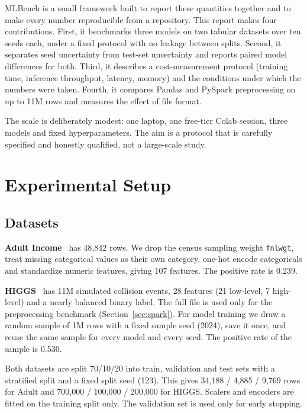 \documentclass[conference]{IEEEtran}
\begin{document}
MLBench is a small framework built to report these quantities together and to make every number reproducible from a repository. This report makes four contributions. First, it benchmarks three models on two tabular datasets over ten seeds each, under a fixed protocol with no leakage between splits. Second, it separates seed uncertainty from test-set uncertainty and reports paired model differences for both. Third, it describes a cost-measurement protocol (training time, inference throughput, latency, memory) and the conditions under which the numbers were taken. Fourth, it compares Pandas and PySpark preprocessing on up to 11M rows and measures the effect of file format.

The scale is deliberately modest: one laptop, one free-tier Colab session, three models and fixed hyperparameters. The aim is a protocol that is carefully specified and honestly qualified, not a large-scale study.

\section{Experimental Setup}
\subsection{Datasets}
\textbf{Adult Income}~\cite{dua2019} has 48{,}842 rows. We drop the census sampling weight \texttt{fnlwgt}, treat missing categorical values as their own category, one-hot encode categoricals and standardize numeric features, giving 107 features. The positive rate is 0.239.

\textbf{HIGGS}~\cite{baldi2014} has 11M simulated collision events, 28 features (21 low-level, 7 high-level) and a nearly balanced binary label. The full file is used only for the preprocessing benchmark (Section~\ref{sec:spark}). For model training we draw a random sample of 1M rows with a fixed sample seed (2024), save it once, and reuse the same sample for every model and every seed. The positive rate of the sample is 0.530.

Both datasets are split 70/10/20 into train, validation and test sets with a stratified split and a fixed split seed (123). This gives 34{,}188 / 4{,}885 / 9{,}769 rows for Adult and 700{,}000 / 100{,}000 / 200{,}000 for HIGGS. Scalers and encoders are fitted on the training split only. The validation set is used only for early stopping.
\end{document}
